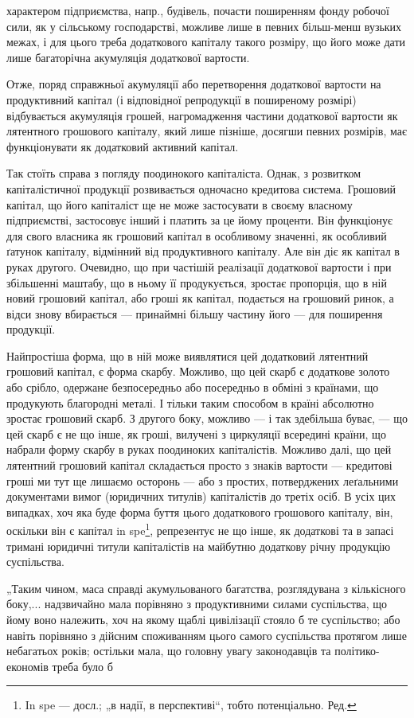 \parcont{}  %
характером підприємства, напр., будівель, почасти поширенням фонду
робочої сили, як у сільському господарстві, можливе лише в певних
більш-менш вузьких межах, і для цього треба додаткового капіталу
такого розміру, що його може дати лише багаторічна акумуляція додаткової
вартости.

Отже, поряд справжньої акумуляції або перетворення додаткової
вартости на продуктивний капітал (і відповідної репродукції в поширеному
розмірі) відбувається акумуляція грошей, нагромадження частини додаткової
вартости як лятентного грошового капіталу, який лише пізніше,
досягши певних розмірів, має функціонувати як додатковий активний
капітал.

Так стоїть справа з погляду поодинокого капіталіста. Однак, з розвитком
капіталістичної продукції розвивається одночасно кредитова система.
Грошовий капітал, що його капіталіст ще не може застосувати в своєму
власному підприємстві, застосовує інший і платить за це йому проценти. Він
функціонує для свого власника як грошовий капітал в особливому
значенні, як особливий ґатунок капіталу, відмінний від продуктивного
капіталу. Але він діє як капітал в руках другого. Очевидно, що при
частішій реалізації додаткової вартости і при збільшенні маштабу, що
в ньому її продукується, зростає пропорція, що в ній новий грошовий
капітал, або гроші як капітал, подається на грошовий ринок, а відси
знову вбирається — принаймні більшу частину його — для поширення
продукції.

Найпростіша форма, що в ній може виявлятися цей додатковий лятентний
грошовий капітал, є форма скарбу. Можливо, що цей скарб є
додаткове золото або срібло, одержане безпосередньо або посередньо
в обміні з країнами, що продукують благородні металі. І тільки таким
способом в країні абсолютно зростає грошовий скарб. З другого боку,
можливо — і так здебільша буває, — що цей скарб є не що інше, як
гроші, вилучені з циркуляції всередині країни, що набрали форму скарбу
в руках поодиноких капіталістів. Можливо далі, що цей лятентний грошовий
капітал складається просто з знаків вартости — кредитові гроші
ми тут ще лишаємо осторонь — або з простих, потверджених леґальними
документами вимог (юридичних титулів) капіталістів до третіх осіб. В
усіх цих випадках, хоч яка буде форма буття цього додаткового грошового
капіталу, він, оскільки він є капітал in spe\footnote*{
In spe — досл.; „в надії, в перспективі“, тобто потенціально. Ред.
}, репрезентує не
що інше, як додаткові та в запасі тримані юридичні титули капіталістів на
майбутню додаткову річну продукцію суспільства.

„Таким чином, маса справді акумульованого багатства, розглядувана
з кількісного боку,... надзвичайно мала порівняно з продуктивними
силами суспільства, що йому воно належить, хоч на якому щаблі цивілізації
стояло б те суспільство; або навіть порівняно з дійсним споживанням
цього самого суспільства протягом лише небагатьох років; остільки
мала, що головну увагу законодавців та політико-економів треба було б
\parbreak{}  %
